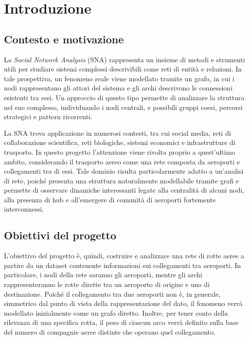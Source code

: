 \chapter{Introduzione}

\section{Contesto e motivazione}

La \textit{Social Network Analysis} (SNA) rappresenta un insieme di metodi e strumenti utili per studiare sistemi complessi descrivibili come reti di entità e relazioni. In tale prospettiva, un fenomeno reale viene modellato tramite un grafo, in cui i nodi rappresentano gli attori del sistema e gli archi descrivono le connessioni esistenti tra essi. Un approccio di questo tipo permette di analizzare la struttura nel suo complesso, individuando i nodi centrali, e possibili gruppi coesi, percorsi strategici e pattern ricorrenti.

La SNA trova applicazione in numerosi contesti, tra cui social media, reti di collaborazione scientifica, reti biologiche, sistemi economici e infrastrutture di trasporto. In questo progetto l’attenzione viene rivolta proprio a quest’ultimo ambito, considerando il trasporto aereo come una rete composta da aeroporti e collegamenti tra di essi. Tale dominio risulta particolarmente adatto a un’analisi di rete, poiché presenta una struttura naturalmente modellabile tramite grafi e permette di osservare dinamiche interessanti legate alla centralità di alcuni nodi, alla presenza di hub e all’emergere di comunità di aeroporti fortemente interconnessi.

\section{Obiettivi del progetto}

L’obiettivo del progetto è, quindi, costruire e analizzare una rete di rotte aeree a partire da un dataset contenente informazioni sui collegamenti tra aeroporti. In particolare, i nodi della rete saranno gli aeroporti, mentre gli archi rappresenteranno le rotte dirette tra un aeroporto di origine e uno di destinazione. Poiché il collegamento tra due aeroporti non è, in generale, simmetrico dal punto di vista della rappresentazione del dato, il fenomeno verrà modellato inizialmente come un grafo diretto. Inoltre, per tener conto della rilevanza di una specifica rotta, il peso di ciascun arco verrà definito sulla base del numero di compagnie aeree distinte che operano quel collegamento.


